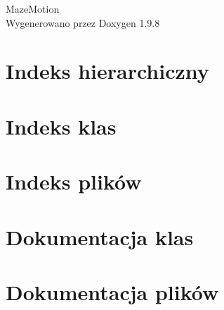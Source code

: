 \documentclass[twoside]{book}
\newcommand{\+}{\discretionary{\mbox{\scriptsize$\hookleftarrow$}}{}{}}
\newcommand{\clearemptydoublepage}{%
    \newpage{\pagestyle{empty}\cleardoublepage}%
  }
\begin{document}
  \raggedbottom
    \hypersetup{pageanchor=false,
                bookmarksnumbered=true,
                pdfencoding=unicode
               }
  \begin{titlepage}
  \vspace*{7cm}
  \begin{center}%
  {\Large Maze\+Motion}\\
  \vspace*{1cm}
  {\large Wygenerowano przez Doxygen 1.9.8}\\
  \end{center}
  \end{titlepage}
  \clearemptydoublepage
  \tableofcontents
  \clearemptydoublepage
  \hypersetup{pageanchor=true}
\chapter{Indeks hierarchiczny}

\chapter{Indeks klas}

\chapter{Indeks plików}

\chapter{Dokumentacja klas}








\chapter{Dokumentacja plików}







  \backmatter
  \newpage
  \clearemptydoublepage
  \printindex
\end{document}
